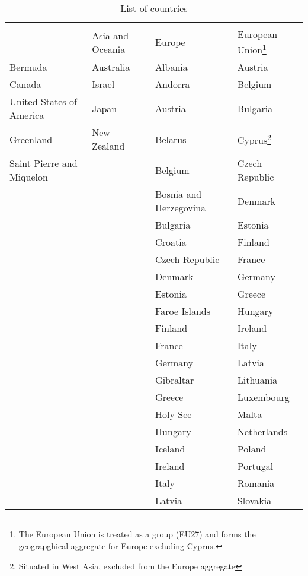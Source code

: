\begin{longtable}{p{3.5cm}p{2.5cm}p{4.5cm}p{2.5cm}}
\caption{List of countries} \\ 
  \toprule
 \rowcolor{@tableheadcolor}\multicolumn{4}{H}{\color{white}Developed regions}\\
 \hhline{%
>{\arrayrulecolor{white}}----%
}
 \rowcolor{@tableheadcolor} \multicolumn{1}{H}{\color{white}North America}&\multicolumn{1}{H}{\color{white}Asia and Oceania}&\multicolumn{1}{H}{\color{white}Europe}&\multicolumn{1}{H}{\color{white}European Union\footnote{The European Union is treated as a group (EU27) and forms the geograpghical aggregate for Europe excluding Cyprus.}} \\
 \midrule Bermuda & Australia & Albania & Austria \\ 
  Canada & Israel & Andorra & Belgium \\ 
  United States of America & Japan & Austria & Bulgaria \\ 
  Greenland & New Zealand & Belarus & Cyprus\footnote{Situated in West Asia, excluded from the Europe aggregate} \\ 
  Saint Pierre and Miquelon &  & Belgium & Czech Republic \\ 
   &  & Bosnia and Herzegovina & Denmark \\ 
   &  & Bulgaria & Estonia \\ 
   &  & Croatia & Finland \\ 
   &  & Czech Republic & France \\ 
   &  & Denmark & Germany \\ 
   &  & Estonia & Greece \\ 
   &  & Faroe Islands & Hungary \\ 
   &  & Finland & Ireland \\ 
   &  & France & Italy \\ 
   &  & Germany & Latvia \\ 
   &  & Gibraltar & Lithuania \\ 
   &  & Greece & Luxembourg \\ 
   &  & Holy See & Malta \\ 
   &  & Hungary & Netherlands \\ 
   &  & Iceland & Poland \\ 
   &  & Ireland & Portugal \\ 
   &  & Italy & Romania \\ 
   &  & Latvia & Slovakia \\ 

\end{longtable}
